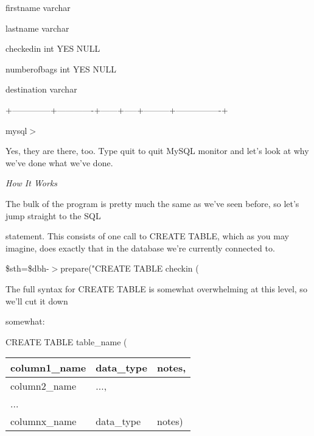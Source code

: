 \documentclass[a4paper,11pt]{book}
\begin{document}
\noindent \textbar  firstname \textbar  varchar \textbar  \textbar  \textbar  \textbar  \textbar 

\noindent \textbar  lastname \textbar  varchar \textbar  \textbar  \textbar  \textbar  \textbar 

\noindent \textbar  checkedin \textbar  int \textbar  YES \textbar  \textbar  NULL \textbar  \textbar 

\noindent \textbar  numberofbags \textbar  int \textbar  YES \textbar  \textbar  NULL \textbar  \textbar 

\noindent \textbar  destination \textbar  varchar \textbar  \textbar  \textbar  \textbar  \textbar 

\noindent +--------------+-------------+------+-----+---------+----------------+

\noindent 

\noindent mysql$>$

\noindent 

\noindent Yes, they are there, too. Type quit to quit MySQL monitor and let's look at why we've done what we've done.

\noindent 

\noindent \textit{How It Works}

\noindent The bulk of the program is pretty much the same as we've seen before, so let's jump straight to the SQL

\noindent statement. This consists of one call to CREATE TABLE, which as you may imagine, does exactly that in the database we're currently connected to.

\noindent 

\noindent \$sth=\$dbh-$>$prepare("CREATE TABLE checkin (

\noindent 

\noindent 

\noindent The full syntax for CREATE TABLE is somewhat overwhelming at this level, so we'll cut it down

\noindent somewhat:

\noindent 

\noindent CREATE TABLE table\_name (

\begin{tabular}{|p{1.3in}|p{0.6in}|p{0.4in}|} \hline 
column1\_name & data\_type & notes, \\ \hline 
column2\_name & ..., &  \\ \hline 
... &  &  \\ \hline 
columnx\_name & data\_type & notes) \\ \hline 
\end{tabular}
\end{document}
